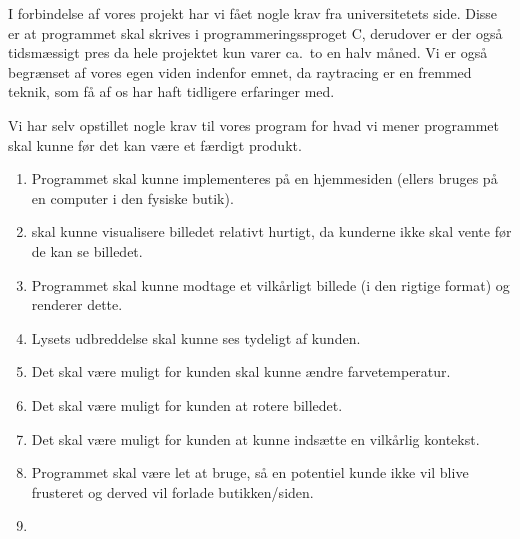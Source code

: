 
I forbindelse af vores projekt har vi fået nogle krav fra universitetets side. Disse er at programmet skal skrives i programmeringssproget C, derudover er der også tidsmæssigt pres da hele projektet kun varer ca.\ to en halv måned. 
Vi er også begrænset af vores egen viden indenfor emnet, da raytracing er en fremmed teknik, som få af os har haft tidligere erfaringer med. 

Vi har selv opstillet nogle krav til vores program for hvad vi mener programmet skal kunne før det kan være et færdigt produkt.
\begin{enumerate}
    \item Programmet skal kunne implementeres på en hjemmesiden (ellers bruges på en computer i den fysiske butik).
    \item skal kunne visualisere billedet relativt hurtigt, da kunderne ikke skal vente før de kan se billedet.
    \item Programmet skal kunne modtage et vilkårligt billede (i den rigtige format) og renderer dette.
    \item Lysets udbreddelse skal kunne ses tydeligt af kunden.
    \item Det skal være muligt for kunden skal kunne ændre farvetemperatur.
    \item Det skal være muligt for kunden at rotere billedet.
    \item Det skal være muligt for kunden at kunne indsætte en vilkårlig kontekst.
    \item Programmet skal være let at bruge, så en potentiel kunde ikke vil blive frusteret og derved vil forlade butikken/siden.
    \item 
\end{enumerate}



